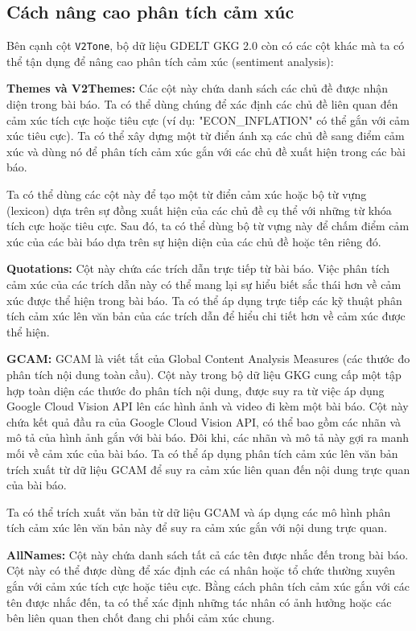 \subsection{Cách nâng cao phân tích cảm xúc}

Bên cạnh cột \texttt{V2Tone}, bộ dữ liệu GDELT GKG 2.0 còn có các cột khác mà ta có thể tận dụng để nâng cao phân tích cảm xúc (sentiment analysis):

\textbf{Themes và V2Themes:} Các cột này chứa danh sách các chủ đề được nhận diện trong bài báo. Ta có thể dùng chúng để xác định các chủ đề liên quan đến cảm xúc tích cực hoặc tiêu cực (ví dụ: "ECON\_INFLATION" có thể gắn với cảm xúc tiêu cực). Ta có thể xây dựng một từ điển ánh xạ các chủ đề sang điểm cảm xúc và dùng nó để phân tích cảm xúc gắn với các chủ đề xuất hiện trong các bài báo.

Ta có thể dùng các cột này để tạo một từ điển cảm xúc hoặc bộ từ vựng (lexicon) dựa trên sự đồng xuất hiện của các chủ đề cụ thể với những từ khóa tích cực hoặc tiêu cực. Sau đó, ta có thể dùng bộ từ vựng này để chấm điểm cảm xúc của các bài báo dựa trên sự hiện diện của các chủ đề hoặc tên riêng đó.

\textbf{Quotations:} Cột này chứa các trích dẫn trực tiếp từ bài báo. Việc phân tích cảm xúc của các trích dẫn này có thể mang lại sự hiểu biết sắc thái hơn về cảm xúc được thể hiện trong bài báo. Ta có thể áp dụng trực tiếp các kỹ thuật phân tích cảm xúc lên văn bản của các trích dẫn để hiểu chi tiết hơn về cảm xúc được thể hiện.

\textbf{GCAM:} GCAM là viết tắt của Global Content Analysis Measures (các thước đo phân tích nội dung toàn cầu). Cột này trong bộ dữ liệu GKG cung cấp một tập hợp toàn diện các thước đo phân tích nội dung, được suy ra từ việc áp dụng Google Cloud Vision API lên các hình ảnh và video đi kèm một bài báo. Cột này chứa kết quả đầu ra của Google Cloud Vision API, có thể bao gồm các nhãn và mô tả của hình ảnh gắn với bài báo. Đôi khi, các nhãn và mô tả này gợi ra manh mối về cảm xúc của bài báo. Ta có thể áp dụng phân tích cảm xúc lên văn bản trích xuất từ dữ liệu GCAM để suy ra cảm xúc liên quan đến nội dung trực quan của bài báo.

Ta có thể trích xuất văn bản từ dữ liệu GCAM và áp dụng các mô hình phân tích cảm xúc lên văn bản này để suy ra cảm xúc gắn với nội dung trực quan.

\textbf{AllNames:} Cột này chứa danh sách tất cả các tên được nhắc đến trong bài báo. Cột này có thể được dùng để xác định các cá nhân hoặc tổ chức thường xuyên gắn với cảm xúc tích cực hoặc tiêu cực. Bằng cách phân tích cảm xúc gắn với các tên được nhắc đến, ta có thể xác định những tác nhân có ảnh hưởng hoặc các bên liên quan then chốt đang chi phối cảm xúc chung.

